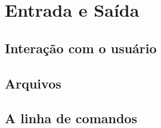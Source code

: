 \chapter{Entrada e Saída}

    \section*{Interação com o usuário}

    \section*{Arquivos}

    \section*{A linha de comandos}